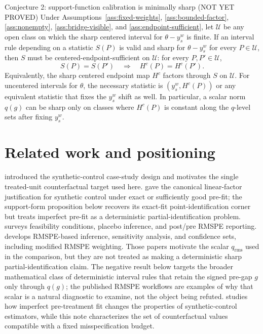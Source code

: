 \documentclass[11pt]{article}
\theoremstyle{definition}
\theoremstyle{plain}
\theoremstyle{remark}
\begin{document}
Conjecture 2: support-function calibration is minimally sharp (NOT YET PROVED)
Under Assumptions~\ref{ass:fixed-weights}, \ref{ass:bounded-factor}, \ref{ass:nonempty}, \ref{ass:bridge-visible}, and \ref{ass:endpoint-sufficient}, let \(\mathcal U\) be any open class on which the sharp centered interval for \(\theta-y_s^w\) is finite. If an interval rule depending on a statistic \(S(P)\) is valid and sharp for \(\theta-y_s^w\) for every \(P\in\mathcal U\), then \(S\) must be centered-endpoint-sufficient on \(\mathcal U\): for every \(P,P'\in\mathcal U\),
\[
S(P)=S(P')\quad\Longrightarrow\quad H^c(P)=H^c(P').
\]
Equivalently, the sharp centered endpoint map \(H^c\) factors through \(S\) on \(\mathcal U\). For uncentered intervals for \(\theta\), the necessary statistic is \((y_s^w,H^c(P))\) or any equivalent statistic that fixes the \(y_s^w\) shift as well. In particular, a scalar norm \(q(g)\) can be sharp only on classes where \(H^c(P)\) is constant along the \(q\)-level sets after fixing \(y_s^w\).

\section{Related work and positioning}
\cite{AbadieGardeazabal2003} introduced the synthetic-control case-study design
and motivates the single treated-unit counterfactual target used here.
\cite{AbadieDiamondHainmueller2010} gave the canonical linear-factor
justification for synthetic control under exact or sufficiently good pre-fit;
the support-form proposition below recovers its exact-fit point-identification
corner but treats imperfect pre-fit as a deterministic partial-identification
problem.
\cite{Abadie2021} surveys feasibility conditions, placebo inference, and
post/pre RMSPE reporting.  \cite{FirpoPossebom2018} develops RMSPE-based
inference, sensitivity analysis, and confidence sets, including modified RMSPE
weighting.  Those papers motivate the scalar \(q_{\mathrm{rms}}\) used in the
comparison, but they are not treated as making a deterministic sharp
partial-identification claim.  The negative result below targets the broader
mathematical class of deterministic interval rules that retain the signed
pre-gap \(g\) only through \(q(g)\); the published RMSPE workflows are examples
of why that scalar is a natural diagnostic to examine, not the object being
refuted.
\cite{FermanPinto2021} studies how imperfect pre-treatment fit changes the
properties of synthetic-control estimators, while this note characterizes the
set of counterfactual values compatible with a fixed misspecification budget.
\end{document}
